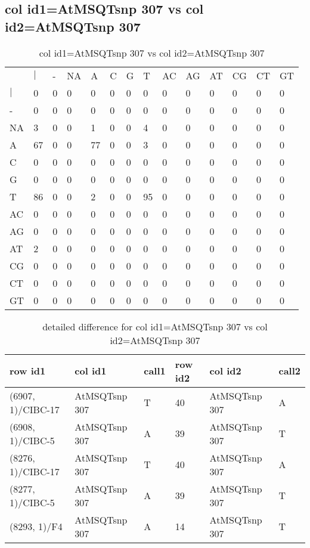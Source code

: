 \subsection{col id1=AtMSQTsnp 307 vs col id2=AtMSQTsnp 307}
\begin{center}
\begin{longtable}{|l|l|l|l|l|l|l|l|l|l|l|l|l|l|}
\caption{col id1=AtMSQTsnp 307 vs col id2=AtMSQTsnp 307} \label{table_dm840}\\
\hline
\\
\hline
&$|$&-&NA&A&C&G&T&AC&AG&AT&CG&CT&GT\\
$|$&0&0&0&0&0&0&0&0&0&0&0&0&0\\
-&0&0&0&0&0&0&0&0&0&0&0&0&0\\
NA&3&0&0&1&0&0&4&0&0&0&0&0&0\\
A&67&0&0&77&0&0&3&0&0&0&0&0&0\\
C&0&0&0&0&0&0&0&0&0&0&0&0&0\\
G&0&0&0&0&0&0&0&0&0&0&0&0&0\\
T&86&0&0&2&0&0&95&0&0&0&0&0&0\\
AC&0&0&0&0&0&0&0&0&0&0&0&0&0\\
AG&0&0&0&0&0&0&0&0&0&0&0&0&0\\
AT&2&0&0&0&0&0&0&0&0&0&0&0&0\\
CG&0&0&0&0&0&0&0&0&0&0&0&0&0\\
CT&0&0&0&0&0&0&0&0&0&0&0&0&0\\
GT&0&0&0&0&0&0&0&0&0&0&0&0&0\\
\hline
\end{longtable}
\end{center}

\begin{center}
\begin{longtable}{|l|l|l|l|l|l|}
\caption{detailed difference for col id1=AtMSQTsnp 307 vs col id2=AtMSQTsnp 307} \label{table_dm841}\\
\hline
row id1&col id1&call1&row id2&col id2&call2\\
\hline
(6907, 1)/CIBC-17&AtMSQTsnp 307&T&40&AtMSQTsnp 307&A\\
(6908, 1)/CIBC-5&AtMSQTsnp 307&A&39&AtMSQTsnp 307&T\\
(8276, 1)/CIBC-17&AtMSQTsnp 307&T&40&AtMSQTsnp 307&A\\
(8277, 1)/CIBC-5&AtMSQTsnp 307&A&39&AtMSQTsnp 307&T\\
(8293, 1)/F4&AtMSQTsnp 307&A&14&AtMSQTsnp 307&T\\
\hline
\end{longtable}
\end{center}

